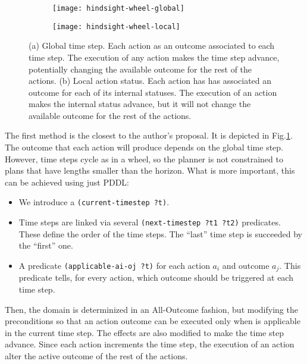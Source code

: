 \documentclass[../root.tex]{subfiles}
\begin{document}
\begin{figure}[tbhp]
	\centering
	\begin{subfigure}[b]{0.4\columnwidth}
		\texttt{[image: hindsight-wheel-global]}
		\caption{}
		\label{fig:wheel-global}
	\end{subfigure}
	
	\begin{subfigure}[b]{0.5\columnwidth}
		\texttt{[image: hindsight-wheel-local]}
		\caption{}
		\label{fig:wheel-local}
	\end{subfigure}
	\caption{
		(a) Global time step. Each action as an outcome associated to each
			time step. The execution of any action makes the time step advance,
			potentially changing the available outcome for the rest of the actions.
		(b) Local action status. Each action has has associated an outcome for each
			of its internal statuses. The execution of an action makes the internal
			status advance, but it will not change the available outcome for the
            rest of the actions.
	}
	\label{fig:hindsight-wheels}
\end{figure}

The first method is the closest to the author's proposal. It is depicted
in Fig.\ref{fig:wheel-global}. The outcome that each action will
produce depends on the global time step.
However, time steps cycle as in a wheel, so the planner
is not constrained to plans that have lengths smaller than the horizon. What is more important,
this can be achieved using just PDDL:
\begin{itemize}
\item We introduce a \texttt{(current-timestep ?t)}.
\item Time steps are linked via several \texttt{(next-timestep ?t1 ?t2)} predicates. These define
the order of the time steps. The ``last'' time step is succeeded by the ``first'' one.
\item A predicate \texttt{(applicable-ai-oj ?t)} for each action $ a_i $ and outcome $ a_j $.
This predicate
tells, for every action, which outcome should be triggered at each time step.
\end{itemize}

Then, the domain is determinized in an All-Outcome fashion, but modifying the preconditions
so that an action outcome can be executed only when is applicable in the current time step.
The effects are also modified to make the time step advance. Since each action increments
the time step, the execution of an action alter the active outcome of the rest of the
actions.
\end{document}
